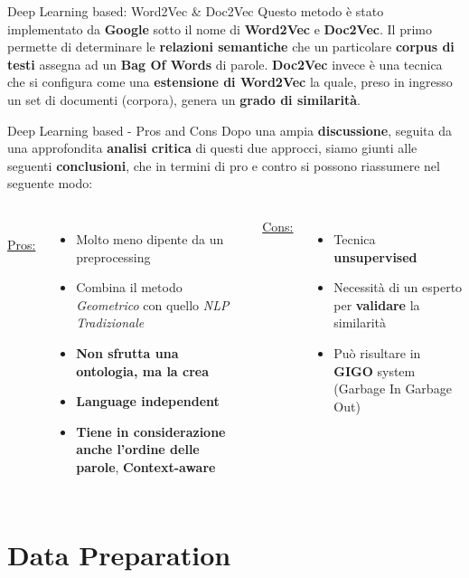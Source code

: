 \documentclass[british]{beamer}
\begin{document}
\begin{frame}{Deep Learning based: Word2Vec \& Doc2Vec}
	Questo metodo \`{e} stato implementato da \textbf{Google} sotto il nome di \textbf{Word2Vec} e \textbf{Doc2Vec}.
	Il primo permette di determinare le \textbf{relazioni semantiche} che un particolare \textbf{corpus di testi} assegna ad un \textbf{Bag Of Words} di parole.
	\textbf{Doc2Vec} invece \`{e} una tecnica che si configura come una \textbf{estensione di Word2Vec} la quale, preso in ingresso un set di documenti (corpora), genera un \textbf{grado di similarit\`{a}}.
\end{frame}

\begin{frame}{Deep Learning based - Pros and Cons}
	Dopo una ampia \textbf{discussione}, seguita da una approfondita \textbf{analisi critica} di questi due approcci, siamo giunti alle seguenti \textbf{conclusioni}, che in termini di pro e contro si possono riassumere nel seguente modo:
	\begin{columns}
		\\
		\underline{Pros:}
		\begin{itemize}
			\item Molto meno dipente da un preprocessing
			\item Combina il metodo \textit{Geometrico} con quello \textit{NLP Tradizionale}
			\item \textbf{Non sfrutta una ontologia, ma la \alert{crea}} 
			\item \textbf{\alert{Language independent}}
			\item \textbf{\alert{Tiene in considerazione anche l'ordine delle parole}}, \textbf{Context-aware}
		\end{itemize}
		\underline{Cons:}
		\begin{itemize}
			\item Tecnica \textbf{unsupervised}
			\item Necessit\`{a} di un esperto per \textbf{validare} la similarit\`{a}
			\item Pu\`{o} risultare in \textbf{GIGO} system (Garbage In Garbage Out)
		\end{itemize}
	\end{columns}
\end{frame}
	
\section{Data Preparation}
\end{document}
